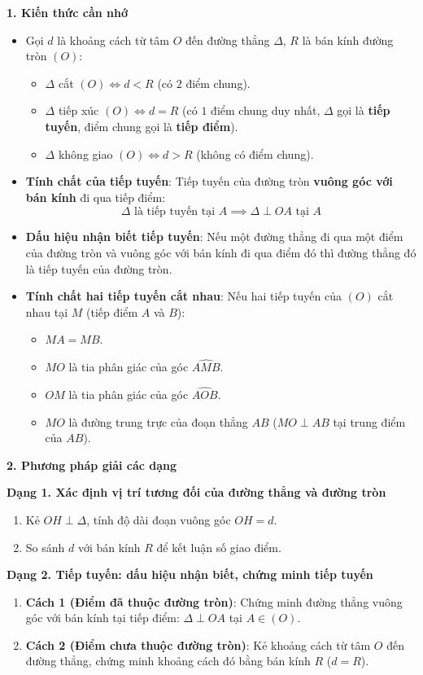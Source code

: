 \textbf{1. Kiến thức cần nhớ}
\begin{itemize}
\item Gọi $d$ là khoảng cách từ tâm $O$ đến đường thẳng $\Delta$, $R$ là bán kính đường tròn $(O)$:
\begin{itemize}
\item $\Delta$ cắt $(O) \iff \boxed{d < R}$ (có $2$ điểm chung).
\item $\Delta$ tiếp xúc $(O) \iff \boxed{d = R}$ (có $1$ điểm chung duy nhất, $\Delta$ gọi là \textbf{tiếp tuyến}, điểm chung gọi là \textbf{tiếp điểm}).
\item $\Delta$ không giao $(O) \iff \boxed{d > R}$ (không có điểm chung).
\end{itemize}
\item \textbf{Tính chất của tiếp tuyến}: Tiếp tuyến của đường tròn \textbf{vuông góc với bán kính} đi qua tiếp điểm:
$$\boxed{\Delta\text{ là tiếp tuyến tại } A \implies \Delta \perp OA\text{ tại } A}$$
\item \textbf{Dấu hiệu nhận biết tiếp tuyến}: Nếu một đường thẳng đi qua một điểm của đường tròn và vuông góc với bán kính đi qua điểm đó thì đường thẳng đó là tiếp tuyến của đường tròn.
\item \textbf{Tính chất hai tiếp tuyến cắt nhau}: Nếu hai tiếp tuyến của $(O)$ cắt nhau tại $M$ (tiếp điểm $A$ và $B$):
\begin{itemize}
\item $MA = MB$.
\item $MO$ là tia phân giác của góc $\widehat{AMB}$.
\item $OM$ là tia phân giác của góc $\widehat{AOB}$.
\item $MO$ là đường trung trực của đoạn thẳng $AB$ ($MO \perp AB$ tại trung điểm của $AB$).
\end{itemize}
\end{itemize}

\textbf{2. Phương pháp giải các dạng}

\textbf{Dạng 1. Xác định vị trí tương đối của đường thẳng và đường tròn}
\begin{enumerate}
\item Kẻ $OH \perp \Delta$, tính độ dài đoạn vuông góc $OH = d$.
\item So sánh $d$ với bán kính $R$ để kết luận số giao điểm.
\end{enumerate}

\textbf{Dạng 2. Tiếp tuyến: dấu hiệu nhận biết, chứng minh tiếp tuyến}
\begin{enumerate}
\item \textbf{Cách 1 (Điểm đã thuộc đường tròn)}: Chứng minh đường thẳng vuông góc với bán kính tại tiếp điểm: $\Delta \perp OA$ tại $A \in (O)$.
\item \textbf{Cách 2 (Điểm chưa thuộc đường tròn)}: Kẻ khoảng cách từ tâm $O$ đến đường thẳng, chứng minh khoảng cách đó bằng bán kính $R$ ($d = R$).
\end{enumerate}


